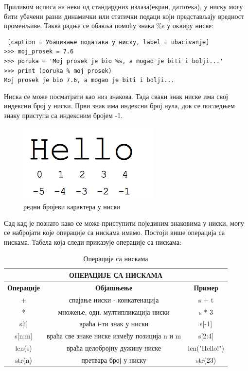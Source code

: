 Приликом исписа на неки од стандардних излаза(екран, датотека), у ниску могу бити убачени разни динамички или статички подаци који представљају вредност променљиве. Таква радња се обавља помоћу знака \%s у оквиру ниске:

\begin{lstlisting} [caption = Убацивање података у ниску, label = ubacivanje]
>>> moj_prosek = 7.6
>>> poruka = 'Moj prosek je bio %s, a mogao je biti i bolji...'
>>> print (poruka % moj_prosek)
Moj prosek je bio 7.6, a mogao je biti i bolji...
\end{lstlisting}

Ниска се може посматрати као низ знакова. Тада сваки знак ниске има свој индексни број у ниски. Први знак има индексни број нула, док се последњем знаку приступа са индексним бројем -1.

\begin{figure}[hеre]
\centering
\includegraphics{hello_string.png}
\caption{редни бројеви карактера у ниски}
\label{slike:hello}
\end{figure}


Сад кад је познато како се може приступити појединим знаковима у ниски, могу се набројати које операције са нискама имамо. Постоји више операција са нискама. Табела која следи приказује операције са нискама:

\begin{table}[h]
\centering
\begin{tabular}{|c|c|c|} \hline
\multicolumn{3}{|c|}{\textbf{ОПЕРАЦИЈЕ СА НИСКАМА}}\\ \hline
\textbf{Операције} & \textbf{Објашњење} & \textbf{Пример} \\ \hline
                 + & спајање ниски - конкатенација & s + t \\ \hline
                 * & множење, одн. мултипликација ниски & s * 3 \\ \hline
              s[i] & враћа i-ти знак у ниски & s[-1] \\ \hline
            s[n:m] & враћа све знаке ниске између позиција n и m & s[2:4] \\ \hline
            len(s) & враћа целобројну дужину ниске & len("Hello!") \\ \hline
            str(n) & претвара број у ниску & str(23) \\ \hline
\end{tabular}\medskip
\caption{Операције са нискама}
\label{tabele:strings}
\end{table}

